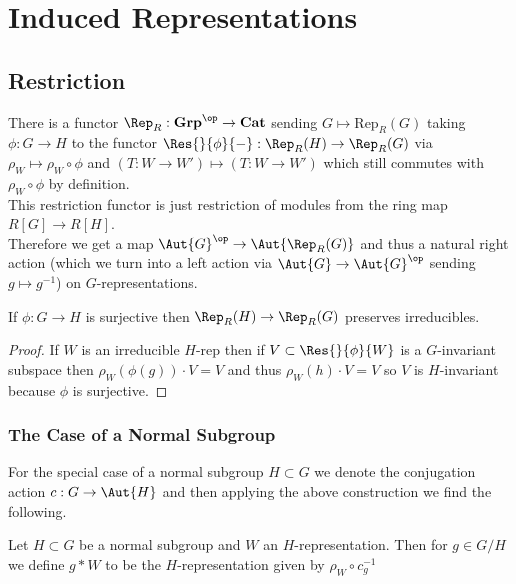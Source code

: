 \documentclass[12pt]{article}
\begin{document}
\section{Induced Representations}

\subsection{Restriction}

\begin{rmk}
There is a functor $\Rep_R : \mathbf{Grp}^\op \to \mathbf{Cat}$ sending $G \mapsto \mathrm{Rep}_R(G)$ taking $\phi : G \to H$ to the functor $\Res{}{\phi}{-} : \Rep_R(H) \to \Rep_R(G)$ via $\rho_W \mapsto \rho_W \circ \phi$ and $(T : W \to W') \mapsto (T : W \to W')$ which still commutes with $\rho_W \circ \phi$ by definition.
\bigskip\\
This restriction functor is just restriction of modules from the ring map $R[G] \to R[H]$.
\bigskip\\
Therefore we get a map $\Aut{G}^\op \to \Aut{\Rep_R(G)}$ and thus a natural right action (which we turn into a left action via $\Aut{G} \to \Aut{G}^\op$ sending $g \mapsto g^{-1}$) on $G$-representations. 
\end{rmk}

\begin{prop}
If $\phi : G \to H$ is surjective then $\Rep_R(H) \to \Rep_R(G)$ preserves irreducibles.
\end{prop}

\begin{proof}
If $W$ is an irreducible $H$-rep then if $V \subset \Res{}{\phi}{W}$ is a $G$-invariant subspace then $\rho_W(\phi(g)) \cdot V = V$ and thus $\rho_W(h) \cdot V = V$ so $V$ is $H$-invariant because $\phi$ is surjective.
\end{proof}

\subsubsection{The Case of a Normal Subgroup}

\begin{rmk}
For the special case of a normal subgroup $H \subset G$ we denote the conjugation action $c : G \to \Aut{H}$ and then applying the above construction we find the following.
\end{rmk}

\begin{defn}
Let $H \subset G$ be a normal subgroup and $W$ an $H$-representation. Then for $g \in G / H$ we define $g * W$ to be the $H$-representation given by $\rho_W \circ c_g^{-1}$ 
\end{defn}
\end{document}
